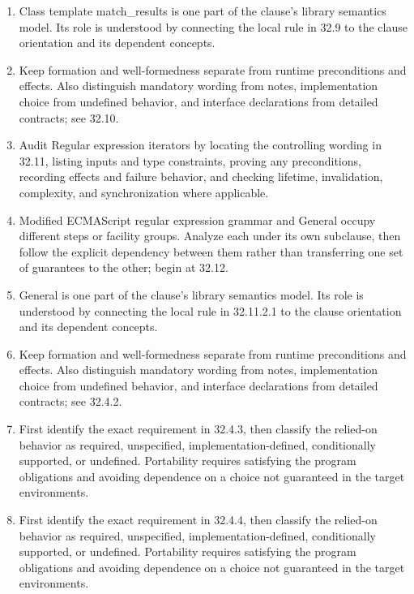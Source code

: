 \documentclass[11pt,letterpaper]{article}
\begin{document}
\begin{enumerate}
\item Class template match\_\allowbreak{}results is one part of the clause's library semantics model. Its role is understood by connecting the local rule in 32.9 to the clause orientation and its dependent concepts.
\item Keep formation and well-formedness separate from runtime preconditions and effects. Also distinguish mandatory wording from notes, implementation choice from undefined behavior, and interface declarations from detailed contracts; see 32.10.
\item Audit Regular expression iterators by locating the controlling wording in 32.11, listing inputs and type constraints, proving any preconditions, recording effects and failure behavior, and checking lifetime, invalidation, complexity, and synchronization where applicable.
\item Modified ECMAScript regular expression grammar and General occupy different steps or facility groups. Analyze each under its own subclause, then follow the explicit dependency between them rather than transferring one set of guarantees to the other; begin at 32.12.
\item General is one part of the clause's library semantics model. Its role is understood by connecting the local rule in 32.11.2.1 to the clause orientation and its dependent concepts.
\item Keep formation and well-formedness separate from runtime preconditions and effects. Also distinguish mandatory wording from notes, implementation choice from undefined behavior, and interface declarations from detailed contracts; see 32.4.2.
\item First identify the exact requirement in 32.4.3, then classify the relied-on behavior as required, unspecified, implementation-defined, conditionally supported, or undefined. Portability requires satisfying the program obligations and avoiding dependence on a choice not guaranteed in the target environments.
\item First identify the exact requirement in 32.4.4, then classify the relied-on behavior as required, unspecified, implementation-defined, conditionally supported, or undefined. Portability requires satisfying the program obligations and avoiding dependence on a choice not guaranteed in the target environments.
\end{enumerate}
\end{document}
